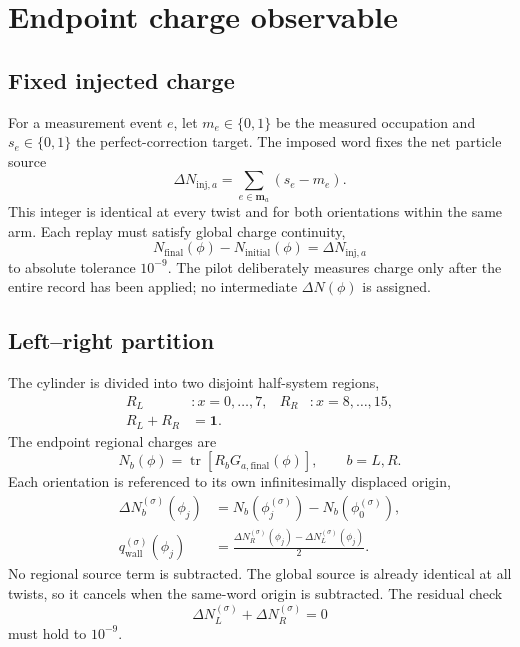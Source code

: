 \documentclass[aps,prb,twocolumn,floatfix,nofootinbib,superscriptaddress]{revtex4-2}
\newcommand{\tr}{\operatorname{tr}}
\begin{document}
\section{Endpoint charge observable}

\subsection{Fixed injected charge}

For a measurement event $e$, let $m_e\in\{0,1\}$ be the measured occupation
and $s_e\in\{0,1\}$ the perfect-correction target.  The imposed word fixes
the net particle source
\begin{equation}
  \Delta N_{\mathrm{inj},a}
  =\sum_{e\in\boldsymbol m_a}(s_e-m_e).
  \label{eq:injection}
\end{equation}
This integer is identical at every twist and for both orientations within the
same arm.  Each replay must satisfy global charge continuity,
\begin{equation}
  N_{\mathrm{final}}(\phi)
  -N_{\mathrm{initial}}(\phi)
  =\Delta N_{\mathrm{inj},a}
  \label{eq:global-continuity}
\end{equation}
to absolute tolerance $10^{-9}$.  The pilot deliberately measures charge only
after the entire record has been applied; no intermediate $\Delta N(\phi)$
is assigned.

\subsection{Left--right partition}

The cylinder is divided into two disjoint half-system regions,
\begin{align}
  R_L&:x=0,\ldots,7, & R_R&:x=8,\ldots,15,\\
  R_L+R_R&=\mathbf{1}.&&
  \label{eq:regions}
\end{align}
The endpoint regional charges are
\begin{equation}
  N_b(\phi)
  =\tr\!\left[
  R_bG_{a,\mathrm{final}}(\phi)
  \right],
  \qquad b=L,R.
\end{equation}
Each orientation is referenced to its own infinitesimally displaced origin,
\begin{align}
  \Delta N_b^{(\sigma)}(\phi_j)
  &=N_b(\phi_j^{(\sigma)})
    -N_b(\phi_0^{(\sigma)}),\\
  q_{\mathrm{wall}}^{(\sigma)}(\phi_j)
  &=\frac{
  \Delta N_R^{(\sigma)}(\phi_j)
  -\Delta N_L^{(\sigma)}(\phi_j)}{2}.
  \label{eq:qwall}
\end{align}
No regional source term is subtracted.  The global source is already identical
at all twists, so it cancels when the same-word origin is subtracted.  The
residual check
\begin{equation}
  \Delta N_L^{(\sigma)}
  +\Delta N_R^{(\sigma)}
  =0
  \label{eq:regional-balance}
\end{equation}
must hold to $10^{-9}$.
\end{document}
